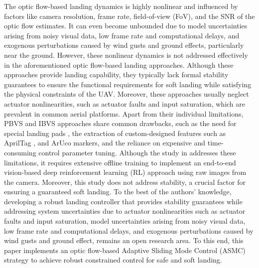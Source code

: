 \documentclass{IEEEtaes}
\begin{document}
The optic flow-based landing dynamics is highly nonlinear and influenced by factors like camera resolution, frame rate, field-of-view (FoV), and the SNR of the optic flow estimates.
It can even become unbounded due to model uncertainties arising from noisy visual data, low frame rate and computational delays, and exogenous perturbations caused by wind gusts and ground effects, particularly near the ground.
However, these nonlinear dynamics is not addressed effectively in the aforementioned optic flow-based landing approaches. 
Although these approaches provide landing capability, they typically lack formal stability guarantees to ensure the functional requirements for soft landing while satisfying the physical constraints of the UAV.
Moreover, these approaches usually neglect actuator nonlinearities, such as actuator faults and input saturation, which are prevalent in common aerial platforms.
Apart from their individual limitations, PBVS and IBVS approaches share common drawbacks, such as the need for special landing pads \cite{wenzel2011}, the extraction of custom-designed features such as AprilTag \cite{lin2022}, and ArUco \cite{salehi2021} markers, and the reliance on expensive and time-consuming control parameter tuning.
Although the study in \cite{ladosz2024} addresses these limitations, it requires extensive offline training to implement an end-to-end vision-based deep reinforcement learning (RL) approach using raw images from the camera.
Moreover, this study does not address stability, a crucial factor for ensuring a guaranteed soft landing.
To the best of the authors' knowledge, developing a robust landing controller that provides stability guarantees while addressing system uncertainties due to actuator nonlinearities such as actuator faults and input saturation, model uncertainties arising from noisy visual data, low frame rate and computational delays, and exogenous perturbations caused by wind gusts and ground effect, remains an open research area.
To this end, this paper implements an optic flow-based Adaptive Sliding Mode Control (ASMC) strategy to achieve robust constrained control for safe and soft landing.
\end{document}
